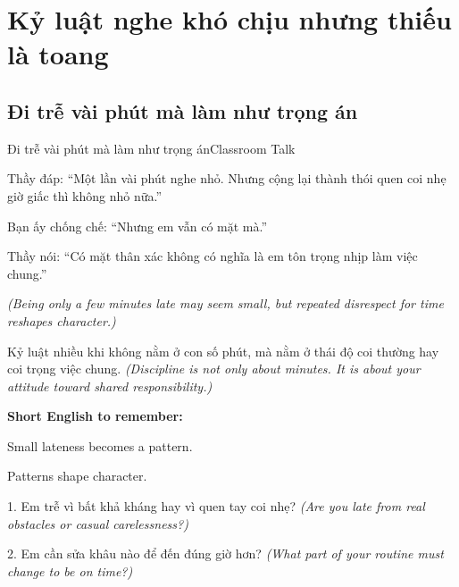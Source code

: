 \chapter{Kỷ luật nghe khó chịu nhưng thiếu là toang}

\section{Đi trễ vài phút mà làm như trọng án}
\begin{truyen}{Đi trễ vài phút mà làm như trọng án}{Classroom Talk}

Thầy đáp: ``Một lần vài phút nghe nhỏ. Nhưng cộng lại thành thói quen coi nhẹ giờ giấc thì không nhỏ nữa.''

Bạn ấy chống chế: ``Nhưng em vẫn có mặt mà.''

Thầy nói: ``Có mặt thân xác không có nghĩa là em tôn trọng nhịp làm việc chung.''

\textit{(Being only a few minutes late may seem small, but repeated disrespect for time reshapes character.)}
\end{truyen}

\begin{baihoc}
Kỷ luật nhiều khi không nằm ở con số phút, mà nằm ở thái độ coi thường hay coi trọng việc chung.
\textit{(Discipline is not only about minutes. It is about your attitude toward shared responsibility.)}
\end{baihoc}

\begin{ghinhoanh}
\textbf{Short English to remember:}

Small lateness becomes a pattern.

Patterns shape character.
\end{ghinhoanh}

\begin{tuhocnhanh}
1. Em trễ vì bất khả kháng hay vì quen tay coi nhẹ? \textit{(Are you late from real obstacles or casual carelessness?)}

2. Em cần sửa khâu nào để đến đúng giờ hơn? \textit{(What part of your routine must change to be on time?)}
\end{tuhocnhanh}
\ngancach

